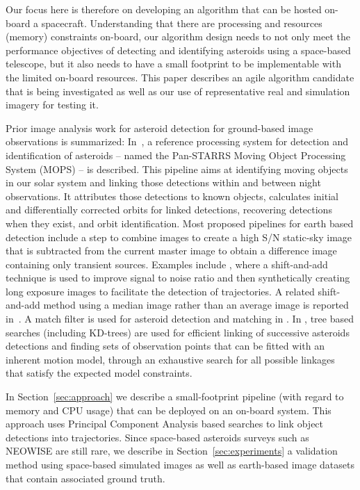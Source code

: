 \documentclass{article}
\begin{document}
Our focus here is therefore on developing an algorithm that can be hosted on-board a spacecraft.  Understanding that there are processing and resources (memory) constraints on-board, our algorithm design needs to not only meet the performance objectives of detecting and identifying asteroids using a space-based telescope, but it also needs to have a small footprint to be implementable with the limited on-board resources.  This paper describes an agile algorithm candidate that is being investigated as well as our use of representative real and simulation imagery for testing it.

Prior image analysis work for asteroid detection for ground-based image observations is summarized: In~\cite{denneau2013pan}, a reference processing system for detection and identification of asteroids -- named the Pan-STARRS Moving Object Processing System (MOPS) --  is described. This pipeline aims at identifying moving objects in our solar system and linking those detections within and between night observations. It attributes those detections to known objects, calculates initial and differentially corrected orbits for linked detections, recovering detections when they exist, and orbit identification. Most proposed pipelines for earth based detection include a step to combine images to create a high S/N static-sky image that is subtracted from the current master image to obtain a difference image containing only transient sources. Examples include \cite{shao2014finding}, where a shift-and-add technique is used to improve  signal to noise ratio and then synthetically creating long exposure images to facilitate the detection of trajectories. A related shift-and-add method using a median  image rather than an average image is reported in~\cite{yanagisawa2005automatic}. A match filter is used for asteroid detection and matching in \cite{gural2005matched}. In \cite{kubica2005variable,kubica2005multiple,kubica2007efficient}, tree based searches (including KD-trees) are used for efficient linking of successive asteroids detections and finding sets of observation points that can be fitted with an inherent motion model, through an exhaustive search for all possible linkages that satisfy the expected model constraints.
	
In Section~\ref{sec:approach} we describe a small-footprint pipeline (with regard to memory and CPU usage) that can be deployed on an on-board system. This approach uses Principal Component Analysis based searches to link object detections into trajectories. Since space-based asteroids surveys such as NEOWISE are still rare, we describe in Section~\ref{sec:experiments} a validation method using space-based simulated images as well as earth-based image datasets that contain associated ground truth.
\end{document}
